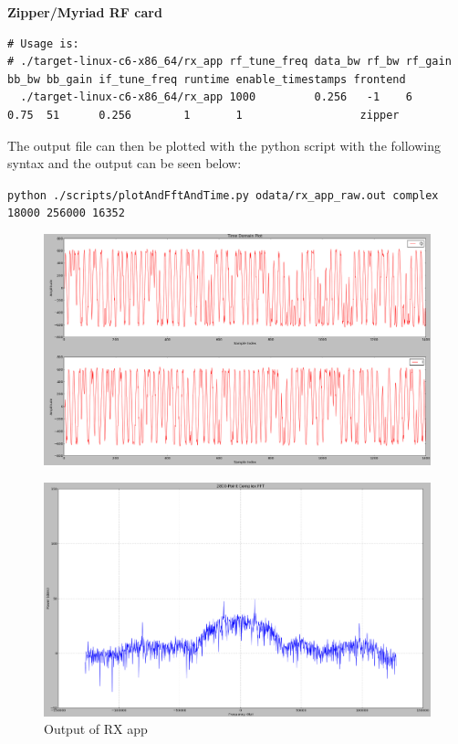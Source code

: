 \noindent\textbf{Zipper/Myriad RF card}
\scriptsize
\noindent
\begin{verbatim}
# Usage is:
# ./target-linux-c6-x86_64/rx_app rf_tune_freq data_bw rf_bw rf_gain bb_bw bb_gain if_tune_freq runtime enable_timestamps frontend
  ./target-linux-c6-x86_64/rx_app 1000         0.256   -1    6       0.75  51      0.256        1       1                  zipper
\end{verbatim}
\small
\par\medskip
\noindent The output file can then be plotted with the python script with the following syntax and the output can be seen below:\par\medskip
\noindent\texttt{python ./scripts/plotAndFftAndTime.py odata/rx\_app\_raw.out complex 18000 256000 16352}\par
	\begin{figure}[h]
	 	\centering
		\includegraphics[scale=.2]{rx_app_iq_plot}
		\label{fig:rx_app_iq_plot}
	\end{figure}
	\begin{figure}[h]
	 	\centering
		\includegraphics[scale=.2]{rx_app_fft_plot}
		\caption{Output of RX app}
		\label{fig:rx_app_fft_plot}
	\end{figure}
